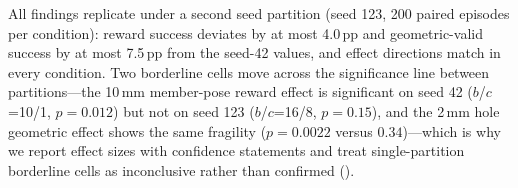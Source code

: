 All findings replicate under a second seed partition (seed 123, 200 paired
episodes per condition): reward success deviates by at most 4.0\,pp and
geometric-valid success by at most 7.5\,pp from the seed-42 values, and
effect directions match in every condition. Two borderline cells move across
the significance line between partitions---the 10\,mm member-pose reward
effect is significant on seed 42 ($b$/$c$=10/1, $p=0.012$) but not on seed
123 ($b$/$c$=16/8, $p=0.15$), and the 2\,mm hole geometric effect shows the
same fragility ($p=0.0022$ versus $0.34$)---which is why we report effect
sizes with confidence statements and treat single-partition borderline cells
as inconclusive rather than confirmed ().
